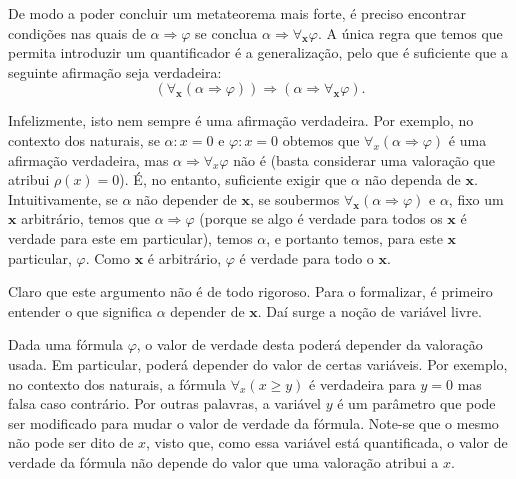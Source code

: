 \documentclass{report}
\theoremstyle{definition}
\theoremstyle{remark}
\renewcommand{\bf}[1]{\mathbf{#1}}
\newcommand{\imply}{\mathbin{\Rightarrow}}
\begin{document}
	De modo a poder concluir um metateorema mais forte, é preciso encontrar condições nas quais de $\alpha \imply \varphi$ se conclua $\alpha \imply \forall_{\bf x} \varphi$. A única regra que temos que permita introduzir um quantificador é a generalização, pelo que é suficiente que a seguinte afirmação seja verdadeira:
	\begin{equation}\label{folax4}
	(\forall_{\bf x} (\alpha \imply \varphi)) \imply (\alpha \imply \forall_{\bf x} \varphi).
	\end{equation}
	
	Infelizmente, isto nem sempre é uma afirmação verdadeira. Por exemplo, no contexto dos naturais, se $\alpha : x = 0$ e $\varphi : x = 0$ obtemos que $\forall_x (\alpha \imply \varphi)$ é uma afirmação verdadeira, mas $\alpha \imply \forall_x \varphi$ não é (basta considerar uma valoração que atribui $\rho(x) = 0$). É, no entanto, suficiente exigir que $\alpha$ não dependa de $\bf x$. Intuitivamente, se $\alpha$ não depender de $\bf x$, se soubermos $\forall_{\bf x} (\alpha \imply \varphi)$ e $\alpha$, fixo um $\bf x$ arbitrário, temos que $\alpha \imply \varphi$ (porque se algo é verdade para todos os $\bf x$ é verdade para este em particular), temos $\alpha$, e portanto temos, para este $\bf x$ particular, $\varphi$. Como $\bf x$ é arbitrário, $\varphi$ é verdade para todo o $\bf x$.
	
	Claro que este argumento não é de todo rigoroso. Para o formalizar, é primeiro entender o que significa $\alpha$ depender de $\bf x$. Daí surge a noção de variável livre.
	
	Dada uma fórmula $\varphi$, o valor de verdade desta poderá depender da valoração usada. Em particular, poderá depender do valor de certas variáveis. Por exemplo, no contexto dos naturais, a fórmula $\forall_x (x \geq y)$ é verdadeira para $y = 0$ mas falsa caso contrário. Por outras palavras, a variável $y$ é um parâmetro que pode ser modificado para mudar o valor de verdade da fórmula. Note-se que o mesmo não pode ser dito de $x$, visto que, como essa variável está quantificada, o valor de verdade da fórmula não depende do valor que uma valoração atribui a $x$.
	
\end{document}
